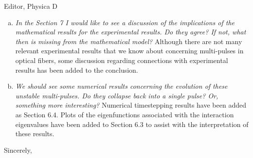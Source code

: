 \documentclass[11pt]{letter}
\begin{document}
\begin{letter}{Editor, Physica D}
\begin{enumerate}[(a)]
\item \emph{In the Section 7 I would like to see a discussion of the implications of the mathematical results for the experimental results. Do they agree? If not, what then is missing from the mathematical model?} Although there are not many relevant experimental results that we know about concerning multi-pulses in optical fibers, some discussion regarding connections with experimental results has been added to the conclusion.
\vspace{4mm}

\item \emph{We should see some numerical results concerning the evolution of these unstable multi-pulses. Do they collapse back into a single pulse? Or, something more interesting?} Numerical timestepping results have been added as Section 6.4. Plots of the eigenfunctions associated with the interaction eigenvalues have been added to Section 6.3 to assist with the interpretation of these results.
\vspace{4mm}

\end{enumerate}

\closing{Sincerely,}

\end{letter}
\end{document}
